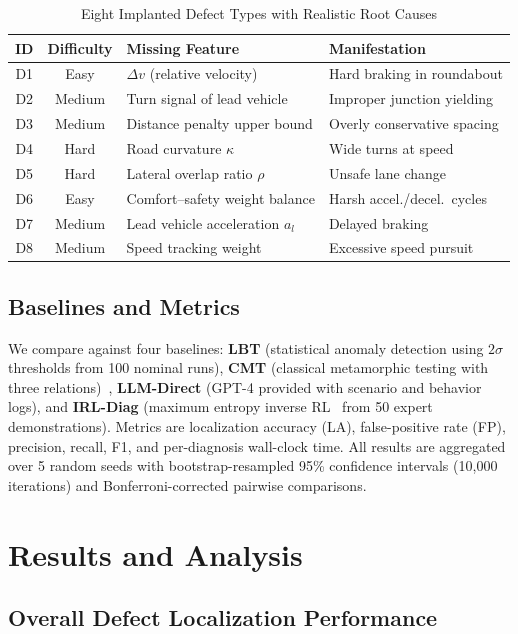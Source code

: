 \documentclass[journal]{IEEEtran}
\theoremstyle{plain}
\begin{document}
\begin{table}[t]
\centering\small
\caption{Eight Implanted Defect Types with Realistic Root Causes}
\label{tab:defects}
\begin{tabular}{ccll}
\toprule
\textbf{ID} & \textbf{Difficulty} & \textbf{Missing Feature} & \textbf{Manifestation} \\\midrule
D1 & Easy & $\Delta v$ (relative velocity) & Hard braking in roundabout \\
D2 & Medium & Turn signal of lead vehicle & Improper junction yielding \\
D3 & Medium & Distance penalty upper bound & Overly conservative spacing \\
D4 & Hard & Road curvature $\kappa$ & Wide turns at speed \\
D5 & Hard & Lateral overlap ratio $\rho$ & Unsafe lane change \\
D6 & Easy & Comfort--safety weight balance & Harsh accel./decel.\ cycles \\
D7 & Medium & Lead vehicle acceleration $a_l$ & Delayed braking \\
D8 & Medium & Speed tracking weight & Excessive speed pursuit \\
\bottomrule
\end{tabular}
\end{table}

\subsection{Baselines and Metrics}

We compare against four baselines: \textbf{LBT} (statistical anomaly detection using $2\sigma$ thresholds from 100 nominal runs), \textbf{CMT} (classical metamorphic testing with three relations)~\cite{deng2023rmt}, \textbf{LLM-Direct} (GPT-4 provided with scenario and behavior logs), and \textbf{IRL-Diag} (maximum entropy inverse RL~\cite{ng2000policy} from 50 expert demonstrations). Metrics are localization accuracy (LA), false-positive rate (FP), precision, recall, F1, and per-diagnosis wall-clock time. All results are aggregated over 5 random seeds with bootstrap-resampled 95\% confidence intervals (10,000 iterations) and Bonferroni-corrected pairwise comparisons.

\section{Results and Analysis}

\subsection{Overall Defect Localization Performance}
\end{document}
